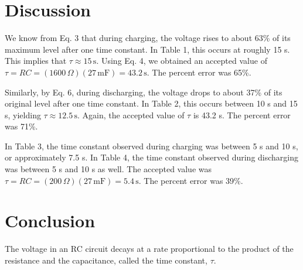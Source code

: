 \documentclass[11pt, titlepage, letterpaper, twoside]{article}
\begin{document}
\pagebreak

\section{Discussion}

We know from Eq. 3 that during charging, the voltage rises to about 63\% of its maximum level after one time constant.
In Table 1, this occurs at roughly 15 s. This implies that $\tau \approx 15\,\mathrm{s}$.
Using Eq. 4, we obtained an accepted value of $\tau = RC = (1600\,\Omega)(27\,\mathrm{mF}) = 43.2\,\mathrm{s}$.
The percent error was 65\%.

Similarly, by Eq. 6, during discharging, the voltage drops to about 37\% of its original level after one time constant.
In Table 2, this occurs between 10 s and 15 s, yielding $\tau \approx 12.5\,\mathrm{s}$.
Again, the accepted value of $\tau$ is 43.2 s.
The percent error was 71\%.

In Table 3, the time constant observed during charging was between 5 s and 10 s, or approximately 7.5 s.
In Table 4, the time constant observed during discharging was between 5 s and 10 s as well.
The accepted value was $\tau = RC = (200\,\Omega)(27\,\mathrm{mF}) = 5.4\,\mathrm{s}$.
The percent error was 39\%.


\section{Conclusion}
The voltage in an RC circuit decays at a rate proportional to the product of the resistance and the capacitance,
called the time constant, $\tau$.
\end{document}
